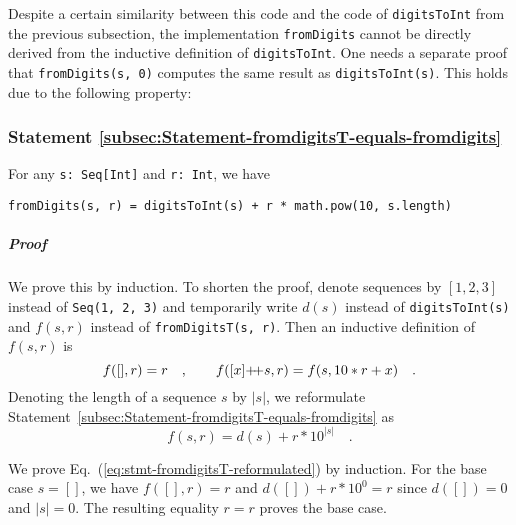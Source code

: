 \noindent Despite a certain similarity between this code and the code
of \lstinline!digitsToInt! from the previous subsection, the implementation
\lstinline!fromDigits! cannot be directly derived from the inductive
definition of \lstinline!digitsToInt!. One needs a separate proof
that \lstinline!fromDigits(s, 0)! computes the same result as \lstinline!digitsToInt(s)!.
This holds due to the following property:

\subsubsection{Statement \label{subsec:Statement-fromdigitsT-equals-fromdigits}\ref{subsec:Statement-fromdigitsT-equals-fromdigits}}

For any \lstinline!s: Seq[Int]! and \lstinline!r: Int!, we have
\begin{lstlisting}
fromDigits(s, r) = digitsToInt(s) + r * math.pow(10, s.length)
\end{lstlisting}


\subparagraph{Proof}

We prove this by induction. To shorten the proof, denote sequences
by $\left[1,2,3\right]$ instead of \lstinline!Seq(1, 2, 3)! and
temporarily write $d(s)$ instead of \lstinline!digitsToInt(s)! and
$f(s,r)$ instead of \lstinline!fromDigitsT(s, r)!. Then an inductive
definition of $f(s,r)$ is
\begin{equation}
f([],r)=r\quad,\quad\quad f([x]{\displaystyle }{+\negmedspace+} s,r)=f(s,10*r+x)\quad.\label{eq:stmt-fromdigitsT-expand-f}
\end{equation}
Denoting the length of a sequence $s$ by $\left|s\right|$, we reformulate
Statement~\ref{subsec:Statement-fromdigitsT-equals-fromdigits} as
\begin{equation}
f(s,r)=d(s)+r*10^{\left|s\right|}\quad.\label{eq:stmt-fromdigitsT-reformulated}
\end{equation}

We prove Eq.~(\ref{eq:stmt-fromdigitsT-reformulated}) by induction.
For the base case $s=\left[\right]$, we have $f(\left[\right],r)=r$
and $d(\left[\right])+r*10^{0}=r$ since $d(\left[\right])=0$ and
$\left|s\right|=0$. The resulting equality $r=r$ proves the base
case. 

